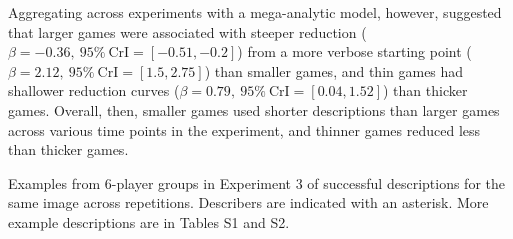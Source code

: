 \documentclass[9pt,twocolumn,twoside]{pnas-new}
\begin{document}
Aggregating across experiments with a mega-analytic model, however,
suggested that larger games were associated with steeper reduction
(\(\beta=-0.36,\:95\%\:\mathrm{CrI}=[-0.51, -0.2]\)) from a more verbose
starting point (\(\beta=2.12,\:95\%\:\mathrm{CrI}=[1.5, 2.75]\)) than
smaller games, and thin games had shallower reduction curves
(\(\beta=0.79,\:95\%\:\mathrm{CrI}=[0.04, 1.52]\)) than thicker games.
Overall, then, smaller games used shorter descriptions than larger games
across various time points in the experiment, and thinner games reduced
less than thicker games.

\begin{table}
    \centering

    \caption{Examples from 6-player groups in Experiment 3 of successful descriptions for the same image across repetitions. Describers are indicated with an asterisk. More example descriptions are in Tables S1 and S2. \\\label{listener-examples}}

\end{table}
\end{document}
